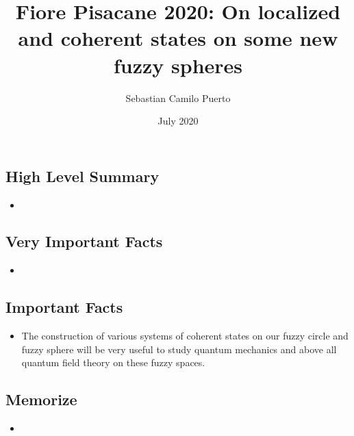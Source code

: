 \documentclass{article}
\title{Fiore Pisacane 2020: On localized and coherent states on some new fuzzy spheres}
\author{Sebastian Camilo Puerto}
\date{July 2020}
\begin{document}
\maketitle

\tableofcontents


\subsection{High Level Summary}

    \begin{itemize}

    \item
    
    \end{itemize}

\subsection{Very Important Facts}

    \begin{itemize}

    \item 
    
    \end{itemize}

\subsection{Important Facts}

    \begin{itemize}

    \item The construction of various systems of coherent states on our fuzzy circle and fuzzy sphere will be very useful to study quantum mechanics and above all quantum field theory on these fuzzy spaces.
    
    \end{itemize}

\subsection{Memorize}

    \begin{itemize}

    \item 
    
    \end{itemize}
\end{document}
